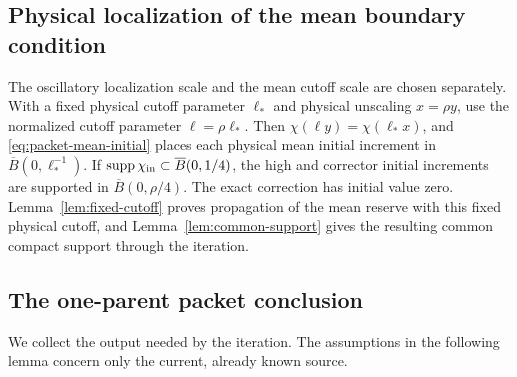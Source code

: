 \subsection{Physical localization of the mean boundary condition}
The oscillatory localization scale and the mean cutoff scale are chosen
separately. With a fixed physical cutoff parameter $\ell_*$ and physical
unscaling $x=\rho y$, use the normalized cutoff parameter
$\ell=\rho\ell_*$. Then
$\chi(\ell y)=\chi(\ell_*x)$, and
\eqref{eq:packet-mean-initial} places each physical mean initial
increment in $\overline B(0,\ell_*^{-1})$. If
$\operatorname{supp}\chi_{\rm in}\subset\overline B(0,1/4)$, the high
and corrector initial increments are supported in
$\overline B(0,\rho/4)$. The exact correction has initial value zero.
Lemma~\ref{lem:fixed-cutoff} proves propagation of the mean reserve
with this fixed physical cutoff, and Lemma~\ref{lem:common-support}
gives the resulting common compact support through the iteration.


\subsection{The one-parent packet conclusion}
We collect the output needed by the iteration. The assumptions in the
following lemma concern only the current, already known source.

